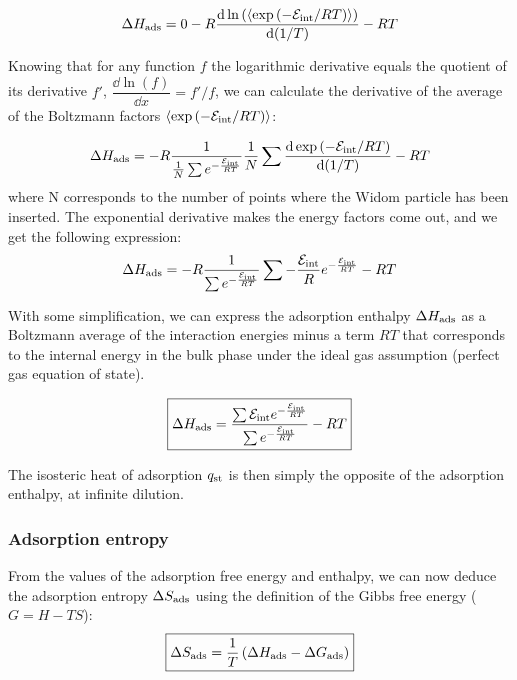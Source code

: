 \documentclass[main.tex]{subfiles}
\begin{document}
\begin{equation}
  \Delta H_{\text{ads}} = 0 - R\dfrac{\mathop{}\mathopen{}\mathrm{d} \ln\left(\langle \exp\left(-\mathcal{E}_{\text{int}}/RT\right) \rangle\right)}{\mathop{}\mathopen{}\mathrm{d} (1/T)} - RT
\end{equation}

Knowing that for any function $f$ the logarithmic derivative equals the quotient of its derivative $f'$, $\dfrac{\dd \ln\left(f\right)}{\dd x}=f'/f$, we can calculate the derivative of the average of the Boltzmann factors $\langle \exp\left(-\mathcal{E}_{\text{int}}/RT\right) \rangle$:

\begin{equation}
  \Delta H_{\text{ads}} = -R\dfrac{1}{\frac{1}{N}\sum e^{-\frac{\mathcal{E}_{\text{int}}}{RT}}} \frac{1}{N}\sum \dfrac{\mathop{}\mathopen{}\mathrm{d} \exp\left(-\mathcal{E}_{\text{int}}/RT\right)}{\mathop{}\mathopen{}\mathrm{d} (1/T)} - RT
\end{equation}
where N corresponds to the number of points where the Widom particle has been inserted.
The exponential derivative makes the energy factors come out, and we get the following expression:
\begin{equation}
  \Delta H_{\text{ads}} = -R\dfrac{1}{\sum e^{-\frac{\mathcal{E}_{\text{int}}}{RT}}} \sum - \frac{\mathcal{E}_{\text{int}}}{R} e^{-\frac{\mathcal{E}_{\text{int}}}{RT}} - RT
\end{equation}

With some simplification, we can express the adsorption enthalpy $\Delta H_{\text{ads}}$ as a Boltzmann average of the interaction energies minus a term $RT$ that corresponds to the internal energy in the bulk phase under the ideal gas assumption (perfect gas equation of state).

\begin{equation}\label{eq:ads_enthalpy}
  \boxed{
  \Delta H_{\text{ads}} = \dfrac{\sum \mathcal{E}_{\text{int}}e^{-\frac{\mathcal{E}_{\text{int}}}{RT}}}{\sum e^{-\frac{\mathcal{E}_{\text{int}}}{RT}}} - RT
  }
\end{equation}

The isosteric heat of adsorption $q_{\text{st}}$ is then simply the opposite of the adsorption enthalpy, at infinite dilution. 

\subsubsection{Adsorption entropy}

From the values of the adsorption free energy and enthalpy, we can now deduce the adsorption entropy $\Delta S_{\text{ads}}$ using the definition of the Gibbs free energy ($G = H-TS$):
\begin{equation}\label{eq:ads_entropy}
  \boxed{
  \Delta S_{\text{ads}} = \dfrac{1}{T} \left(\Delta H_{\text{ads}} - \Delta G_{\text{ads}} \right)
  }
\end{equation}
\end{document}
